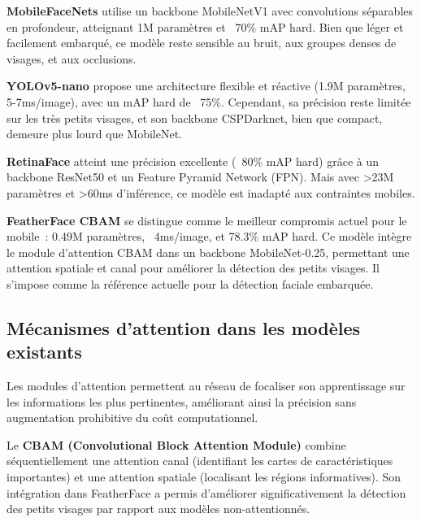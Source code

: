 \begin{onehalfspace}
\hspace{0.65 cm}\textbf{MobileFaceNets} \cite{Chen2018MobileFaceNets} utilise un backbone MobileNetV1 avec convolutions séparables en profondeur, atteignant 1M paramètres et ~70\% mAP hard. Bien que léger et facilement embarqué, ce modèle reste sensible au bruit, aux groupes denses de visages, et aux occlusions.

\hspace{0.65 cm}\textbf{YOLOv5-nano} \cite{Jocher2023YOLOv5} propose une architecture flexible et réactive (1.9M paramètres, 5-7ms/image), avec un mAP hard de ~75\%. Cependant, sa précision reste limitée sur les très petits visages, et son backbone CSPDarknet, bien que compact, demeure plus lourd que MobileNet.

\hspace{0.65 cm}\textbf{RetinaFace} \cite{Deng2020RetinaFace} atteint une précision excellente (~80\% mAP hard) grâce à un backbone ResNet50 et un Feature Pyramid Network (FPN). Mais avec >23M paramètres et >60ms d'inférence, ce modèle est inadapté aux contraintes mobiles.

\hspace{0.65 cm}\textbf{FeatherFace CBAM} \cite{Kim2025FeatherFace} se distingue comme le meilleur compromis actuel pour le mobile~: 0.49M paramètres, ~4ms/image, et 78.3\% mAP hard. Ce modèle intègre le module d'attention CBAM \cite{Woo2018CBAM} dans un backbone MobileNet-0.25, permettant une attention spatiale et canal pour améliorer la détection des petits visages. Il s'impose comme la référence actuelle pour la détection faciale embarquée.

\subsection{Mécanismes d'attention dans les modèles existants}

\hspace{0.65 cm}Les modules d'attention permettent au réseau de focaliser son apprentissage sur les informations les plus pertinentes, améliorant ainsi la précision sans augmentation prohibitive du coût computationnel.

\hspace{0.65 cm}Le \textbf{CBAM (Convolutional Block Attention Module)} \cite{Woo2018CBAM} combine séquentiellement une attention canal (identifiant les cartes de caractéristiques importantes) et une attention spatiale (localisant les régions informatives). Son intégration dans FeatherFace a permis d'améliorer significativement la détection des petits visages par rapport aux modèles non-attentionnés.


\end{onehalfspace}
